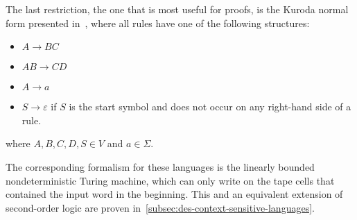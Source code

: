 The last restriction, the one that is most useful for proofs, is the Kuroda normal form presented in~\cite{Pettorossi2022}, where all rules have one of the following structures:
\begin{itemize}
    \setlength\itemsep{0.15em}
    \item $A \to BC$
    \item $AB \to CD$
    \item $A \to a$
    \item $S \to \varepsilon$ if $S$ is the start symbol and does not occur on any right-hand side of a rule.
\end{itemize}
where $A, B, C, D, S \in V$ and $a \in \Sigma$.

The corresponding formalism for these languages is the linearly bounded nondeterministic Turing machine, which can only write on the tape cells that contained the input word in the beginning.
This and an equivalent extension of second-order logic are proven in~\cref{subsec:des-context-sensitive-languages}.
